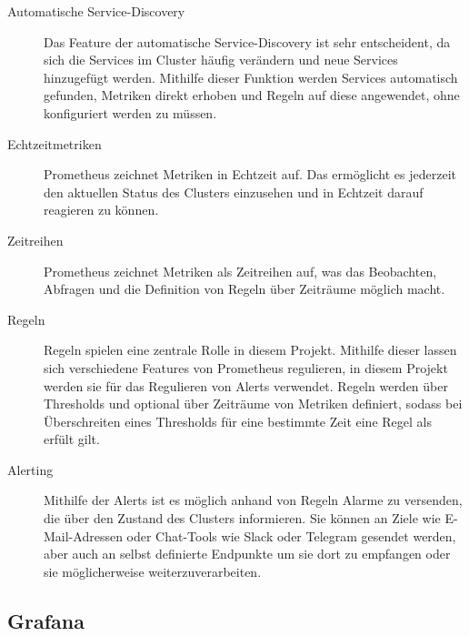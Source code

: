 \documentclass[a4paper,10pt]{scrartcl}
\begin{document}
\begin{description}

\item[Automatische Service-Discovery]
Das Feature der automatische Service-Discovery ist sehr entscheident, da sich die Services im Cluster häufig verändern und neue Services hinzugefügt werden. Mithilfe dieser Funktion werden Services automatisch gefunden, Metriken direkt erhoben und Regeln auf diese angewendet, ohne konfiguriert werden zu müssen.
\item[Echtzeitmetriken]
Prometheus zeichnet Metriken in Echtzeit auf. Das ermöglicht es jederzeit den aktuellen Status des Clusters einzusehen und in Echtzeit darauf reagieren zu können.
\item[Zeitreihen]
Prometheus zeichnet Metriken als Zeitreihen auf, was das Beobachten, Abfragen und die Definition von Regeln über Zeiträume möglich macht. 
\item[Regeln]
Regeln spielen eine zentrale Rolle in diesem Projekt. Mithilfe dieser lassen sich verschiedene Features von Prometheus regulieren, in diesem Projekt werden sie für das Regulieren von Alerts verwendet.
Regeln werden über Thresholds und optional über Zeiträume von Metriken definiert, sodass bei Überschreiten eines Thresholds für eine bestimmte Zeit eine Regel als erfült gilt.
\item[Alerting]
Mithilfe der Alerts ist es möglich anhand von Regeln Alarme zu versenden, die über den Zustand des Clusters informieren. Sie können an Ziele wie E-Mail-Adressen oder Chat-Tools wie Slack oder Telegram gesendet werden, aber auch  an selbst definierte Endpunkte um sie dort zu empfangen oder sie möglicherweise weiterzuverarbeiten.

\end{description}

\begin{figure}[htbp]
  \centering
  \scalebox{.8}{}  
\end{figure}

\subsection{Grafana}
\end{document}
